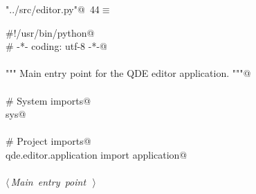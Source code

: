 \documentclass[
    a4paper,      %
    10pt,         %
    openright,    %
    notitlepage,  %
    parskip=half, %
]{scrreprt}       %
\theoremstyle{definition}                    %
\begin{document}
\begin{flushleft} \small
\begin{minipage}{\linewidth}\label{scrap50}\raggedright\small
{} \verb@"../src/editor.py"@\nobreak\ {\footnotesize {44}}$\equiv$
\vspace{-1ex}
\begin{list}{}{} \item
\mbox{}\lstinline@#!/usr/bin/python@\\
\mbox{}\lstinline@# -*- coding: utf-8 -*-@\\
\mbox{}\lstinline@@\\
\mbox{}\lstinline@""" Main entry point for the QDE editor application. """@\\
\mbox{}\lstinline@@\\
\mbox{}\lstinline@# System imports@\\
\mbox{}\lstinline@import sys@\\
\mbox{}\lstinline@@\\
\mbox{}\lstinline@# Project imports@\\
\mbox{}\lstinline@from qde.editor.application import application@\\
\mbox{}\lstinline@@\\
\mbox{}\lstinline@@\hbox{$\langle\,${\itshape Main entry point}\nobreak\ {\footnotesize {}}$\,\rangle$}\lstinline@@\\
\mbox{}\lstinline@@{\NWsep}
\end{list}
\vspace{-1.5ex}
\footnotesize
\begin{list}{}{\setlength{\itemsep}{-\parsep}\setlength{\itemindent}{-\leftmargin}}

\item{}
\end{list}
\end{minipage}\vspace{4ex}
\end{flushleft}
\end{document}
